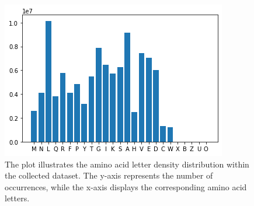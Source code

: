 \documentclass[conference]{IEEEtran}
\begin{document}
\begin{figure}[htp!]
  \centering
  \includegraphics[width=0.8\linewidth]{images/UniqueAminoAcids.png}
  \caption{The plot illustrates the amino acid letter density distribution within the collected dataset. The y-axis represents the number of occurrences, while the x-axis displays the corresponding amino acid letters.}
  \label{fig:dataset_analysis}
\end{figure}
\end{document}
